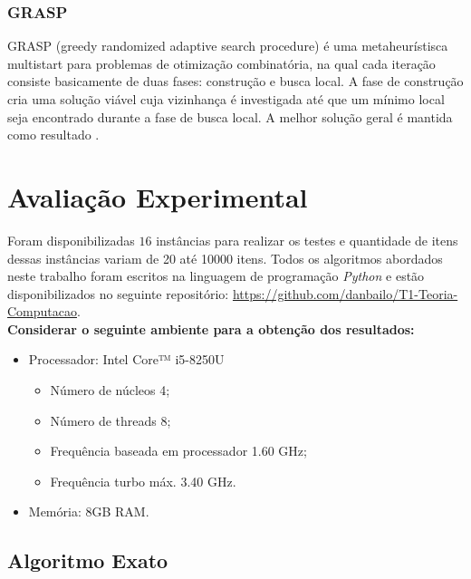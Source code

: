 \documentclass[a4paper, 12pt]{article}
\begin{document}
\subsubsection{GRASP}

GRASP (greedy randomized adaptive search procedure) é uma metaheurístisca multistart para 
problemas de otimização combinatória, na qual cada iteração consiste basicamente de duas fases: construção e busca local. 
A fase de construção cria uma solução viável cuja vizinhança é investigada até que um mínimo local seja 
encontrado durante a fase de busca local. A melhor solução geral é mantida como resultado \cite{feo1995greedy}.


\section{Avaliação Experimental}
Foram disponibilizadas $16$ instâncias para realizar os testes e quantidade de itens dessas instâncias variam
de 20 até 10000 itens. Todos os algoritmos abordados neste trabalho foram escritos na linguagem de programação \textit{Python}
e estão disponibilizados no seguinte repositório: \url{https://github.com/danbailo/T1-Teoria-Computacao}.\\

{\bf Considerar o seguinte ambiente para a obtenção dos resultados:}
\begin{itemize}
    \item Processador: Intel Core™ i5-8250U
    \begin{itemize}
        \item Número de núcleos 4;
        \item Número de threads 8;
        \item Frequência baseada em processador 1.60 GHz;
        \item Frequência turbo máx. 3.40 GHz.
    \end{itemize}
    \item Memória: 8GB RAM.
\end{itemize}

\subsection{Algoritmo Exato}
\end{document}
